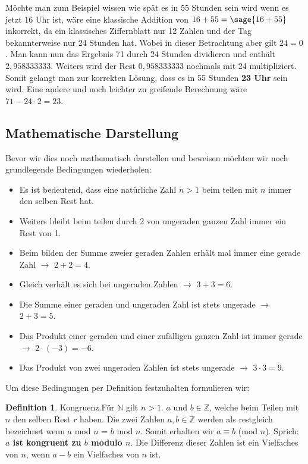 \documentclass[12pt,a4paper]{article}
\theoremstyle{definition}
\newtheorem{defi}{Definition}[section]
\begin{document}
Möchte man zum Beispiel wissen wie spät es in 55 Stunden sein wird wenn es jetzt 16 Uhr ist, wäre eine klassische Addition von $16+55=\sage{16+55}$ inkorrekt, da ein klassisches Ziffernblatt nur 12 Zahlen und der Tag bekannterweise nur 24 Stunden hat.
Wobei in dieser Betrachtung aber gilt $24=0$.
Man kann nun das Ergebnis 71 durch 24 Stunden dividieren und enthält $2,958333333$.
Weiters wird der Rest $0,958333333$ nochmals mit 24 multipliziert.
Somit gelangt man zur korrekten Lösung, dass es in 55 Stunden \textbf{23 Uhr} sein wird.
Eine andere und noch leichter zu greifende Berechnung wäre $71 - 24 \cdot 2 = 23$.

\subsection{Mathematische Darstellung}\label{Mathematische Darstellung}
Bevor wir dies noch mathematisch darstellen und beweisen möchten wir noch grundlegende Bedingungen wiederholen:
\begin{itemize}
    \item Es ist bedeutend, dass eine natürliche Zahl $n>1$ beim teilen mit $n$ immer den selben Rest hat.
    \item Weiters bleibt beim teilen durch 2 von ungeraden ganzen Zahl immer ein Rest von 1.
    \item Beim bilden der Summe zweier geraden Zahlen erhält mal immer eine gerade Zahl $\rightarrow$ $2+2=4$.
    \item Gleich verhält es sich bei ungeraden Zahlen $\rightarrow$ $3+3=6$.
    \item Die Summe einer geraden und ungeraden Zahl ist stets ungerade $\rightarrow$ $2+3=5$.
    \item Das Produkt einer geraden und einer zufälligen ganzen Zahl ist immer gerade $\rightarrow$ $2 \cdot (-3) = -6$.
    \item Das Produkt von zwei ungeraden Zahlen ist stets ungerade $\rightarrow$ $3 \cdot 3 = 9$.
\end{itemize}

Um diese Bedingungen per Definition festzuhalten formulieren wir:
\begin{defi}{Kongruenz}.\newline Für $\mathbb{N}$ gilt $n>1$.
$a$ und $b \in \mathbb{Z}$, welche beim Teilen mit $n$ den selben Rest $r$ haben.
Die zwei Zahlen $a, b \in \mathbb{Z}$ werden als restgleich bezeichnet wenn $a$ mod $n$ = $b$ mod $n$.
Somit erhalten wir $a\equiv b$ (mod $n$). Sprich: \textbf{$a$ ist kongruent zu $b$ modulo $n$}.
Die Differenz dieser Zahlen ist ein Vielfaches von $n$, wenn $a-b$ ein Vielfaches von $n$ ist.
\end{defi}
\end{document}
